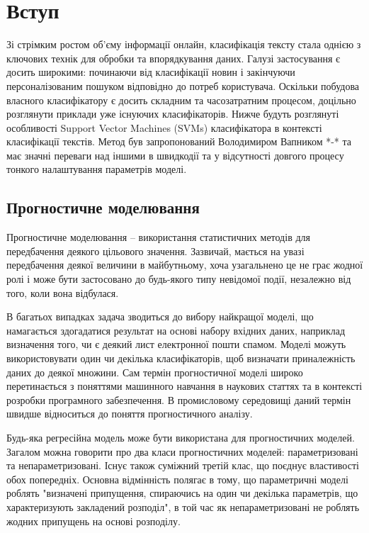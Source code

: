 \section{Вступ}
Зі стрімким ростом об'єму інформації онлайн, класифікація тексту стала однією з ключових
технік для обробки та впорядкування даних. Галузі застосування є досить широкими:
починаючи від класифікації новин і закінчуючи персоналізованим пошуком відповідно до
потреб користувача. Оскільки побудова власного класифікатору є досить складним та
часозатратним процесом, доцільно розглянути приклади уже існуючих класифікаторів.
Нижче будуть розглянуті особливості  Support Vector Machines (SVMs) класифікатора в
контексті класифікації текстів. Метод був запропонований Володимиром Вапником *-* та
має значні переваги над іншими в швидкодії та у відсутності довгого процесу тонкого
налаштування параметрів моделі.

\subsection{Прогностичне моделювання}
Прогностичне моделювання – використання статистичних методів для передбачення деякого цільового значення. Зазвичай, мається на увазі передбачення деякої величини в майбутньому, хоча узагальнено це не грає жодної ролі і може бути застосовано до будь-якого типу невідомої події, незалежно від того, коли вона відбулася.

В багатьох випадках задача зводиться до вибору найкращої моделі, що намагається здогадатися результат на основі набору вхідних даних, наприклад визначення того, чи є деякий лист електронної пошти спамом. Моделі можуть використовувати один чи декілька класифікаторів, щоб визначати приналежність даних до деякої множини. Сам термін прогностичної моделі широко перетинається з поняттями машинного навчання в наукових статтях та в контексті розробки програмного забезпечення. В промисловому середовищі даний термін швидше відноситься до поняття прогностичного аналізу.

Будь-яка регресійна модель може бути використана для прогностичних моделей. Загалом можна говорити про два класи прогностичних моделей: параметризовані та непараметризовані. Існує також суміжний третій клас, що поєднує властивості обох попередніх. Основна відмінність полягає в тому, що параметричні моделі роблять "визначені припущення, спираючись на один чи декілька параметрів, що характеризують закладений розподіл", в той час як непараметризовані не роблять жодних припущень на основі розподілу.

